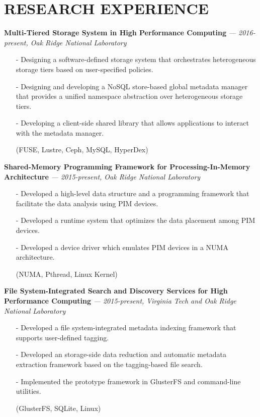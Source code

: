 \section{RESEARCH EXPERIENCE} 
\vspace{0.03in}
  {\bf Multi-Tiered Storage System in High Performance Computing}
   {\it \footnotesize --- 2016-present, Oak Ridge National Laboratory}
   \begin{itemize}[leftmargin=*]
    \setlength\itemsep{-0.02in}
    \item[-] Designing a software-defined storage system that orchestrates
	     heterogeneous storage tiers based on user-specified policies.
    \item[-] Designing and developing a NoSQL store-based global metadata manager
	     that provides a unified namespace abstraction over heterogeneous
	     storage tiers.
    \item[-] Developing a client-side shared library that allows applications to interact
             with the metadata manager.
    \item[] {\small(FUSE, Lustre, Ceph, MySQL, HyperDex)}
   \end{itemize}
  \vspace{-0.15in}
  {\bf Shared-Memory Programming Framework for Processing-In-Memory Architecture}
   {\it \footnotesize --- 2015-present, Oak Ridge National Laboratory}
   \begin{itemize}[leftmargin=*]
    \setlength\itemsep{-0.02in}
    \item[-] Developed a high-level data structure and a programming framework that
             facilitate the data analysis using PIM devices.
    \item[-] Developed a runtime system that optimizes the data placement among PIM devices.
    \item[-] Developed a device driver which emulates PIM devices in a NUMA architecture.
    \item[] {\small(NUMA, Pthread, Linux Kernel)}
   \end{itemize}
  \vspace{-0.15in}
  {\bf File System-Integrated Search and Discovery Services for High Performance Computing}
   {\it \footnotesize --- 2015-present, Virginia Tech and Oak Ridge National Laboratory}
   \begin{itemize}[leftmargin=*]
    \setlength\itemsep{-0.02in}
    \item[-] Developed a file system-integrated metadata indexing framework
	     that supports user-defined tagging.
    \item[-] Developed an storage-side data reduction and automatic metadata
	     extraction framework based on the tagging-based file search.
    \item[-] Implemented the prototype framework in GlusterFS and command-line utilities.
    \item[] {\small(GlusterFS, SQLite, Linux)}
   \end{itemize}
